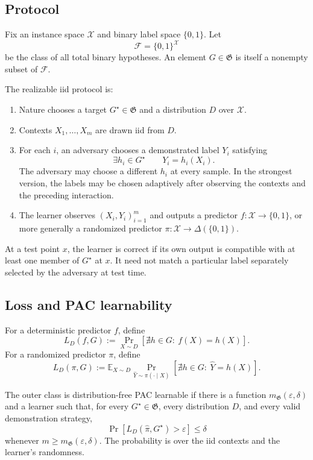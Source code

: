 \documentclass[11pt]{article}
\theoremstyle{definition}
\theoremstyle{remark}
\newcommand{\X}{\mathcal X}
\newcommand{\Y}{\{0,1\}}
\newcommand{\F}{\mathcal F}
\newcommand{\Outer}{\mathfrak G}
\newcommand{\eps}{\varepsilon}
\newcommand{\1}{\mathbf 1}
\begin{document}
\subsection{Protocol}

Fix an instance space $\X$ and binary label space $\Y$. Let
\[
    \F=\Y^{\X}
\]
be the class of all total binary hypotheses. An element $G\in\Outer$ is itself a nonempty subset of $\F$.

The realizable iid protocol is:

\begin{enumerate}
    \item Nature chooses a target $G^\star\in\Outer$ and a distribution $D$ over $\X$.
    \item Contexts $X_1,\ldots,X_m$ are drawn iid from $D$.
    \item For each $i$, an adversary chooses a demonstrated label $Y_i$ satisfying
    \[
        \exists h_i\in G^\star\qquad Y_i=h_i(X_i).
    \]
    The adversary may choose a different $h_i$ at every sample. In the strongest version, the labels may be chosen adaptively after observing the contexts and the preceding interaction.
    \item The learner observes $(X_i,Y_i)_{i=1}^m$ and outputs a predictor $f:\X\to\Y$, or more generally a randomized predictor $\pi:\X\to\Delta(\Y)$.
\end{enumerate}

At a test point $x$, the learner is correct if its own output is compatible with at least one member of $G^\star$ at $x$. It need not match a particular label separately selected by the adversary at test time.

\subsection{Loss and PAC learnability}

For a deterministic predictor $f$, define
\[
    L_D(f,G)
    :=
    \Pr_{X\sim D}\!\left[\nexists h\in G:\ f(X)=h(X)\right].
\]
For a randomized predictor $\pi$, define
\[
    L_D(\pi,G)
    :=
    \mathbb E_{X\sim D}\Pr_{\widehat Y\sim\pi(\cdot\mid X)}
    \!\left[\nexists h\in G:\ \widehat Y=h(X)\right].
\]

The outer class is distribution-free PAC learnable if there is a function $m_{\Outer}(\eps,\delta)$ and a learner such that, for every $G^\star\in\Outer$, every distribution $D$, and every valid demonstration strategy,
\[
    \Pr\!\left[L_D(\widehat\pi,G^\star)>\eps\right]\leq\delta
\]
whenever $m\geq m_{\Outer}(\eps,\delta)$. The probability is over the iid contexts and the learner's randomness.
\end{document}
